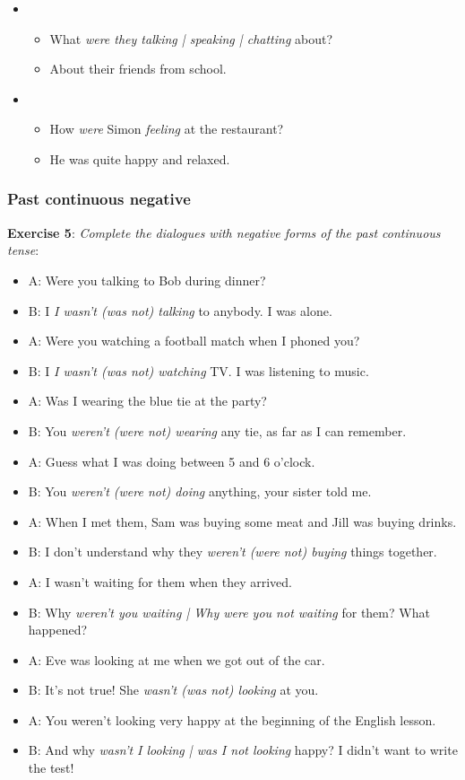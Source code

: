 \begin{itemize}
\item
\begin{itemize}
\item What \textit{were they talking | speaking | chatting} about?
\item About their friends from school.
\end{itemize}

\item
\begin{itemize}
\item How \textit{were} Simon \textit{feeling} at the restaurant?
\item He was quite happy and relaxed.
\end{itemize}

\end{itemize}

\subsubsection{Past continuous negative}

\textbf{Exercise 5}: \textit{Complete the dialogues with negative forms of the past continuous tense}:

\begin{itemize}

\item A: Were you talking to Bob during dinner?
\item B: I \textit{I wasn't (was not) talking} to anybody. I was alone.
\item A: Were you watching a football match when I phoned you?
\item B: I \textit{I wasn't (was not) watching} TV. I was listening to music.
\item A: Was I wearing the blue tie at the party?
\item B: You \textit{weren't (were not) wearing} any tie, as far as I can remember.
\item A: Guess what I was doing between 5 and 6 o'clock.
\item B: You \textit{weren't (were not) doing} anything, your sister told me.
\item A: When I met them, Sam was buying some meat and Jill was buying drinks.
\item B: I don't understand why they \textit{weren't (were not) buying} things together.
\item A: I wasn't waiting for them when they arrived.
\item B: Why \textit{weren't you waiting | Why were you not waiting} for them? What happened?
\item A: Eve was looking at me when we got out of the car. 
\item B: It's not true! She \textit{wasn't (was not) looking} at you.
\item A: You weren't looking very happy at the beginning of the English lesson.
\item B: And why \textit{wasn't I looking | was I not looking} happy? I didn't want to write the test!

\end{itemize}

